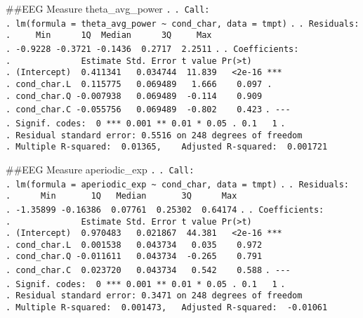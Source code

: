 \documentclass[
]{article}
\begin{document}
\#\#EEG Measure theta\_avg\_power \texttt{.} \texttt{.\ Call:}
\texttt{.\ lm(formula\ =\ theta\_avg\_power\ \textasciitilde{}\ cond\_char,\ data\ =\ tmpt)}
\texttt{.} \texttt{.\ Residuals:}
\texttt{.\ \ \ \ \ Min\ \ \ \ \ \ 1Q\ \ Median\ \ \ \ \ \ 3Q\ \ \ \ \ Max}
\texttt{.\ -0.9228\ -0.3721\ -0.1436\ \ 0.2717\ \ 2.2511} \texttt{.}
\texttt{.\ Coefficients:}
\texttt{.\ \ \ \ \ \ \ \ \ \ \ \ \ \ Estimate\ Std.\ Error\ t\ value\ Pr(\textgreater{}\textbar{}t\textbar{})}
\texttt{.\ (Intercept)\ \ 0.411341\ \ \ 0.034744\ \ 11.839\ \ \ \textless{}2e-16\ ***}
\texttt{.\ cond\_char.L\ \ 0.115775\ \ \ 0.069489\ \ \ 1.666\ \ \ \ 0.097\ .}
\texttt{.\ cond\_char.Q\ -0.007938\ \ \ 0.069489\ \ -0.114\ \ \ \ 0.909}
\texttt{.\ cond\_char.C\ -0.055756\ \ \ 0.069489\ \ -0.802\ \ \ \ 0.423}
\texttt{.\ -\/-\/-}
\texttt{.\ Signif.\ codes:\ \ 0\ \textquotesingle{}***\textquotesingle{}\ 0.001\ \textquotesingle{}**\textquotesingle{}\ 0.01\ \textquotesingle{}*\textquotesingle{}\ 0.05\ \textquotesingle{}.\textquotesingle{}\ 0.1\ \textquotesingle{}\ \textquotesingle{}\ 1}
\texttt{.}
\texttt{.\ Residual\ standard\ error:\ 0.5516\ on\ 248\ degrees\ of\ freedom}
\texttt{.\ Multiple\ R-squared:\ \ 0.01365,\ \ \ \ Adjusted\ R-squared:\ \ 0.001721}

\#\#EEG Measure aperiodic\_exp \texttt{.} \texttt{.\ Call:}
\texttt{.\ lm(formula\ =\ aperiodic\_exp\ \textasciitilde{}\ cond\_char,\ data\ =\ tmpt)}
\texttt{.} \texttt{.\ Residuals:}
\texttt{.\ \ \ \ \ \ Min\ \ \ \ \ \ \ 1Q\ \ \ Median\ \ \ \ \ \ \ 3Q\ \ \ \ \ \ Max}
\texttt{.\ -1.35899\ -0.16386\ \ 0.07761\ \ 0.25302\ \ 0.64174}
\texttt{.} \texttt{.\ Coefficients:}
\texttt{.\ \ \ \ \ \ \ \ \ \ \ \ \ \ Estimate\ Std.\ Error\ t\ value\ Pr(\textgreater{}\textbar{}t\textbar{})}
\texttt{.\ (Intercept)\ \ 0.970483\ \ \ 0.021867\ \ 44.381\ \ \ \textless{}2e-16\ ***}
\texttt{.\ cond\_char.L\ \ 0.001538\ \ \ 0.043734\ \ \ 0.035\ \ \ \ 0.972}
\texttt{.\ cond\_char.Q\ -0.011611\ \ \ 0.043734\ \ -0.265\ \ \ \ 0.791}
\texttt{.\ cond\_char.C\ \ 0.023720\ \ \ 0.043734\ \ \ 0.542\ \ \ \ 0.588}
\texttt{.\ -\/-\/-}
\texttt{.\ Signif.\ codes:\ \ 0\ \textquotesingle{}***\textquotesingle{}\ 0.001\ \textquotesingle{}**\textquotesingle{}\ 0.01\ \textquotesingle{}*\textquotesingle{}\ 0.05\ \textquotesingle{}.\textquotesingle{}\ 0.1\ \textquotesingle{}\ \textquotesingle{}\ 1}
\texttt{.}
\texttt{.\ Residual\ standard\ error:\ 0.3471\ on\ 248\ degrees\ of\ freedom}
\texttt{.\ Multiple\ R-squared:\ \ 0.001473,\ \ \ Adjusted\ R-squared:\ \ -0.01061}
\end{document}
